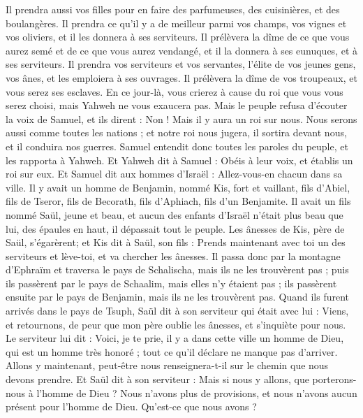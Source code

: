 \begin{multicols}{2}
Il prendra aussi vos filles pour en faire des parfumeuses, des cuisinières, et des boulangères.
Il prendra ce qu’il y a de meilleur parmi vos champs, vos vignes et vos oliviers, et il les donnera à ses serviteurs.
Il prélèvera la dîme de ce que vous aurez semé et de ce que vous aurez vendangé, et il la donnera à ses eunuques, et à ses serviteurs.
Il prendra vos serviteurs et vos servantes, l'élite de vos jeunes gens, vos ânes, et les emploiera à ses ouvrages.
Il prélèvera la dîme de vos troupeaux, et vous serez ses esclaves.
En ce jour-là, vous crierez à cause du roi que vous vous serez choisi, mais Yahweh ne vous exaucera pas.
Mais le peuple refusa d’écouter la voix de Samuel, et ils dirent : Non ! Mais il y aura un roi sur nous.
Nous serons aussi comme toutes les nations ; et notre roi nous jugera, il sortira devant nous, et il conduira nos guerres.
Samuel entendit donc toutes les paroles du peuple, et les rapporta à Yahweh.
Et Yahweh dit à Samuel : Obéis à leur voix, et établis un roi sur eux. Et Samuel dit aux hommes d'Israël : Allez-vous-en chacun dans sa ville.
\VerseOne{}Il y avait un homme de Benjamin, nommé Kis, fort et vaillant, fils d’Abiel, fils de Tseror, fils de Becorath, fils d'Aphiach, fils d'un Benjamite.
Il avait un fils nommé Saül, jeune et beau, et aucun des enfants d'Israël n’était plus beau que lui, des épaules en haut, il dépassait tout le peuple.
Les ânesses de Kis, père de Saül, s’égarèrent; et Kis dit à Saül, son fils : Prends maintenant avec toi un des serviteurs et lève-toi, et va chercher les ânesses.
Il passa donc par la montagne d'Ephraïm et traversa le pays de Schalischa, mais ils ne les trouvèrent pas ; puis ils passèrent par le pays de Schaalim, mais elles n'y étaient pas ; ils passèrent ensuite par le pays de Benjamin, mais ils ne les trouvèrent pas.
Quand ils furent arrivés dans le pays de Tsuph, Saül dit à son serviteur qui était avec lui : Viens, et retournons, de peur que mon père oublie les ânesses, et s’inquiète pour nous.
Le serviteur lui dit : Voici, je te prie, il y a dans cette ville un homme de Dieu, qui est un homme très honoré ; tout ce qu'il déclare ne manque pas d’arriver. Allons y maintenant, peut-être nous renseignera-t-il sur le chemin que nous devons prendre.
Et Saül dit à son serviteur : Mais si nous y allons, que porterons-nous à l'homme de Dieu ? Nous n’avons plus de provisions, et nous n'avons aucun présent pour l'homme de Dieu. Qu’est-ce que nous avons ?

\end{multicols}
